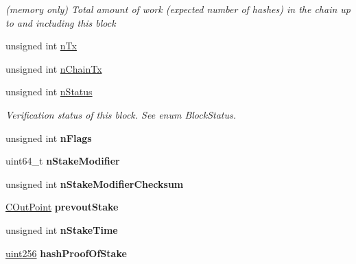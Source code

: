 \begin{DoxyCompactItemize}
\begin{DoxyCompactList}\small\item\em (memory only) Total amount of work (expected number of hashes) in the chain up to and including this block \end{DoxyCompactList}\item 
unsigned int \mbox{\hyperlink{class_c_block_index_ac8e219a377839d2f9133a4387f46e44e}{n\+Tx}}
\item 
unsigned int \mbox{\hyperlink{class_c_block_index_af3c6d6dd8a7579e5ce516d94b98d2db5}{n\+Chain\+Tx}}
\item 
\mbox{\label{class_c_block_index_ac5a336b45ca70e3ed2fc090bf2ee3011}} 
unsigned int \mbox{\hyperlink{class_c_block_index_ac5a336b45ca70e3ed2fc090bf2ee3011}{n\+Status}}
\begin{DoxyCompactList}\small\item\em Verification status of this block. See enum Block\+Status. \end{DoxyCompactList}\item 
\mbox{\label{class_c_block_index_a02aaba7d27ec615e6f9f740353d839de}} 
unsigned int {\bfseries n\+Flags}
\item 
\mbox{\label{class_c_block_index_a2aa226c04d79a4d932ed6eb0abd02cbe}} 
uint64\+\_\+t {\bfseries n\+Stake\+Modifier}
\item 
\mbox{\label{class_c_block_index_ad29fd7c96d1e350aa39c61a2afcfdb26}} 
unsigned int {\bfseries n\+Stake\+Modifier\+Checksum}
\item 
\mbox{\label{class_c_block_index_ac2c040d5e3db73a5ceb87ee4095a405f}} 
\mbox{\hyperlink{class_c_out_point}{C\+Out\+Point}} {\bfseries prevout\+Stake}
\item 
\mbox{\label{class_c_block_index_ae6870336a5bf237680502fa067262af8}} 
unsigned int {\bfseries n\+Stake\+Time}
\item 
\mbox{\label{class_c_block_index_a0618ad34da3f9a1d02ce7a120e055fb9}} 
\mbox{\hyperlink{classuint256}{uint256}} {\bfseries hash\+Proof\+Of\+Stake}
\item 
\mbox{\label{class_c_block_index_a6559fddea3401548ae144e870d150359}} 

\end{DoxyCompactItemize}
